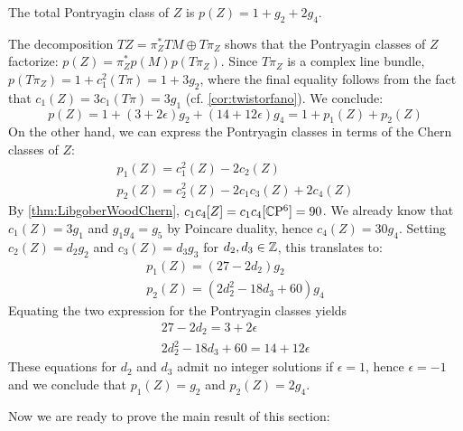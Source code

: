 \begin{lem}
	The total Pontryagin class of $Z$ is $p(Z)=1+g_2+2g_4$.
\end{lem}
\begin{myproof}
	The decomposition $TZ=\pi_Z^*TM\oplus T\pi_Z$ shows that the Pontryagin classes of $Z$ factorize: $p(Z)=\pi^*_Zp(M)p(T\pi_Z)$. Since $T\pi_Z$ is a complex line bundle, $p(T\pi_Z)=1+c_1^2(T\pi)=1+3g_2$, where the final equality follows from the fact that $c_1(Z)=3c_1(T\pi)=3g_1$ (cf. \cref{cor:twistorfano}). We conclude:
	\begin{equation*}
		p(Z)=1+(3+2\epsilon)g_2+(14+12\epsilon)g_4=1+p_1(Z)+p_2(Z)
	\end{equation*}
	On the other hand, we can express the Pontryagin classes in terms of the Chern classes of $Z$:
	\begin{gather*}
		p_1(Z)=c_1^2(Z)-2c_2(Z)\\
		p_2(Z)=c_2^2(Z)-2c_1c_3(Z)+2c_4(Z)
	\end{gather*}
	By \cref{thm:LibgoberWoodChern}, $c_1c_4[Z]=c_1c_4[\mathbb{C}\mathrm{P}^6]=90$. We already know that $c_1(Z)=3g_1$ and $g_1g_4=g_5$ by Poincare duality, hence $c_4(Z)=30g_4$. Setting $c_2(Z)=d_2g_2$ and $c_3(Z)=d_3g_3$ for $d_2,d_3\in\mathbb{Z}$, this translates to:
	\begin{gather*}
		p_1(Z)=(27-2d_2)g_2\\
		p_2(Z)=(2d_2^2-18d_3 +60)g_4
	\end{gather*}
	Equating the two expression for the Pontryagin classes yields
	\begin{gather*}
		27-2d_2=3+2\epsilon\\
		2d_2^2-18d_3+60=14+12\epsilon
	\end{gather*}
	These equations for $d_2$ and $d_3$ admit no integer solutions if $\epsilon=1$, hence $\epsilon=-1$ and we conclude that $p_1(Z)=g_2$ and $p_2(Z)=2g_4$.
\end{myproof}

Now we are ready to prove the main result of this section:

